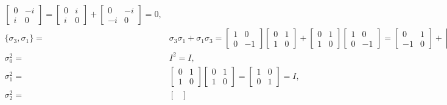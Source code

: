 \documentclass[en]{sol-man}
\begin{document}
\begin{pf}
\begin{align}
\begin{bmatrix}
            0&-i\\
            i&0
        \end{bmatrix}=\begin{bmatrix}
            0&i\\
            i&0
        \end{bmatrix}+\begin{bmatrix}
            0&-i\\
            -i&0
        \end{bmatrix}=0,\\
        \{\sigma_3,\sigma_1\}=&\sigma_3\sigma_1+\sigma_1\sigma_3=\begin{bmatrix}
            1&0\\
            0&-1
        \end{bmatrix}\begin{bmatrix}
            0&1\\
            1&0
        \end{bmatrix}+\begin{bmatrix}
            0&1\\
            1&0
        \end{bmatrix}\begin{bmatrix}
            1&0\\
            0&-1
        \end{bmatrix}=\begin{bmatrix}
            0&1\\
            -1&0
        \end{bmatrix}+\begin{bmatrix}
            0&-1\\
            1&0
        \end{bmatrix}=0,\\
        \sigma_0^2=&I^2=I,\\
        \sigma_1^2=&\begin{bmatrix}
            0&1\\
            1&0
        \end{bmatrix}\begin{bmatrix}
            0&1\\
            1&0
        \end{bmatrix}=\begin{bmatrix}
            1&0\\
            0&1
        \end{bmatrix}=I,\\
        \sigma_2^2=&\begin{bmatrix}

\end{bmatrix}
\end{align}
\end{pf}
\end{document}
